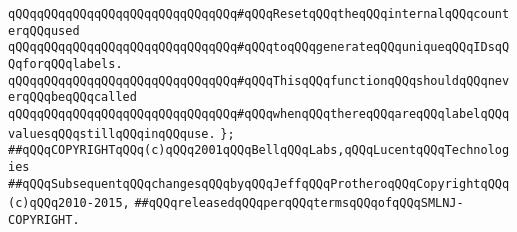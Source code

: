 \verb|qQQqqQQqqQQqqQQqqQQqqQQqqQQqqQQq#qQQqResetqQQqtheqQQqinternalqQQqcounterqQQqused|\newline
\verb|qQQqqQQqqQQqqQQqqQQqqQQqqQQqqQQq#qQQqtoqQQqgenerateqQQquniqueqQQqIDsqQQqforqQQqlabels.|\newline
\verb|qQQqqQQqqQQqqQQqqQQqqQQqqQQqqQQq#qQQqThisqQQqfunctionqQQqshouldqQQqneverqQQqbeqQQqcalled|\newline
\verb|qQQqqQQqqQQqqQQqqQQqqQQqqQQqqQQq#qQQqwhenqQQqthereqQQqareqQQqlabelqQQqvaluesqQQqstillqQQqinqQQquse.|\newline
\newline
\verb|};|\newline
\newline
\newline
\newline
\verb|##qQQqCOPYRIGHTqQQq(c)qQQq2001qQQqBellqQQqLabs,qQQqLucentqQQqTechnologies|\newline
\verb|##qQQqSubsequentqQQqchangesqQQqbyqQQqJeffqQQqProtheroqQQqCopyrightqQQq(c)qQQq2010-2015,|\newline
\verb|##qQQqreleasedqQQqperqQQqtermsqQQqofqQQqSMLNJ-COPYRIGHT.|\newline

